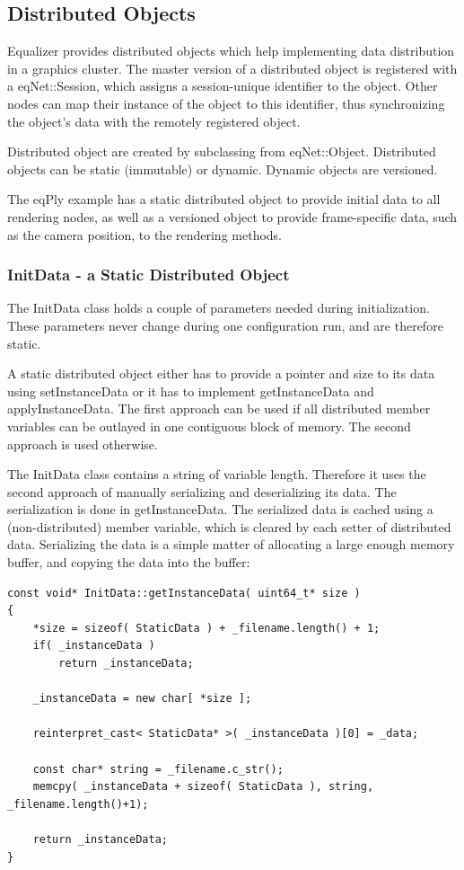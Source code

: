 \documentclass[10pt,a4]{scrartcl}
\begin{document}
\subsection{Distributed Objects}

Equalizer provides distributed objects which help implementing data
distribution in a graphics cluster. The master version of a distributed
object is registered with a \textsf{eqNet::Session}, which assigns a
session-unique identifier to the object. Other nodes can map their
instance of the object to this identifier, thus synchronizing the
object's data with the remotely registered object.

Distributed object are created by subclassing from
\textsf{eqNet::Object}. Distributed objects can be static (immutable) or
dynamic. Dynamic objects are versioned.

The \textsf{eqPly} example has a static distributed object to provide
initial data to all rendering nodes, as well as a versioned object to
provide frame-specific data, such as the camera position, to the
rendering methods.

\subsubsection{InitData - a Static Distributed Object}

The \textsf{InitData} class holds a couple of parameters needed during
initialization. These parameters never change during one configuration
run, and are therefore static.

A static distributed object either has to provide a pointer and size to
its data using \textsf{setInstanceData} or it has to implement
\textsf{getInstanceData} and \textsf{applyInstanceData}. The first
approach can be used if all distributed member variables can be outlayed
in one contiguous block of memory. The second approach is used
otherwise.

The \textsf{InitData} class contains a string of variable
length. Therefore it uses the second approach of manually serializing
and deserializing its data. The serialization is done in
\textsf{getInstanceData}. The serialized data is cached using a
(non-distributed) member variable, which is cleared by each setter of
distributed data. Serializing the data is a simple matter of allocating
a large enough memory buffer, and copying the data into the buffer:

{\footnotesize\begin{lstlisting}
const void* InitData::getInstanceData( uint64_t* size )
{
    *size = sizeof( StaticData ) + _filename.length() + 1;
    if( _instanceData )
        return _instanceData;

    _instanceData = new char[ *size ];

    reinterpret_cast< StaticData* >( _instanceData )[0] = _data;

    const char* string = _filename.c_str();
    memcpy( _instanceData + sizeof( StaticData ), string, _filename.length()+1);

    return _instanceData;
}
\end{lstlisting}}
\end{document}
